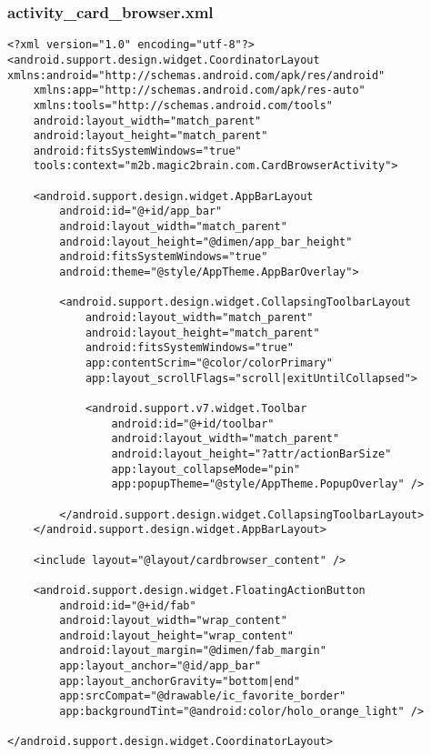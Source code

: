 \subsubsection{activity\_card\_browser.xml}
\begin{lstlisting}
<?xml version="1.0" encoding="utf-8"?>
<android.support.design.widget.CoordinatorLayout xmlns:android="http://schemas.android.com/apk/res/android"
    xmlns:app="http://schemas.android.com/apk/res-auto"
    xmlns:tools="http://schemas.android.com/tools"
    android:layout_width="match_parent"
    android:layout_height="match_parent"
    android:fitsSystemWindows="true"
    tools:context="m2b.magic2brain.com.CardBrowserActivity">

    <android.support.design.widget.AppBarLayout
        android:id="@+id/app_bar"
        android:layout_width="match_parent"
        android:layout_height="@dimen/app_bar_height"
        android:fitsSystemWindows="true"
        android:theme="@style/AppTheme.AppBarOverlay">

        <android.support.design.widget.CollapsingToolbarLayout
            android:layout_width="match_parent"
            android:layout_height="match_parent"
            android:fitsSystemWindows="true"
            app:contentScrim="@color/colorPrimary"
            app:layout_scrollFlags="scroll|exitUntilCollapsed">

            <android.support.v7.widget.Toolbar
                android:id="@+id/toolbar"
                android:layout_width="match_parent"
                android:layout_height="?attr/actionBarSize"
                app:layout_collapseMode="pin"
                app:popupTheme="@style/AppTheme.PopupOverlay" />

        </android.support.design.widget.CollapsingToolbarLayout>
    </android.support.design.widget.AppBarLayout>

    <include layout="@layout/cardbrowser_content" />

    <android.support.design.widget.FloatingActionButton
        android:id="@+id/fab"
        android:layout_width="wrap_content"
        android:layout_height="wrap_content"
        android:layout_margin="@dimen/fab_margin"
        app:layout_anchor="@id/app_bar"
        app:layout_anchorGravity="bottom|end"
        app:srcCompat="@drawable/ic_favorite_border"
        app:backgroundTint="@android:color/holo_orange_light" />

</android.support.design.widget.CoordinatorLayout>
\end{lstlisting}

